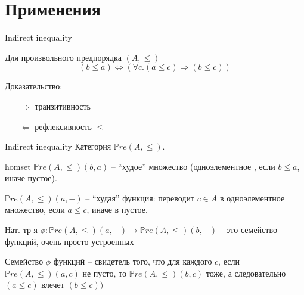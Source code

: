 \documentclass[
  russian,
  aspectratio=169,
  xcolor={svgnames},
  hyperref={colorlinks,citecolor=DeepPink4}]{beamer}
\begin{document}
\section{Применения}

\begin{frame}[fragile]{Indirect inequality}

Для произвольного предпорядка $(A,\leqslant)$
$$ (b \leqslant a) \Leftrightarrow(\forall c . (a \leqslant c) \Rightarrow(b \leqslant c)) $$

Доказательство:
\begin{enumerate}
 \item[$\Rightarrow$] транзитивность
 \item[$\Leftarrow$] рефлексивность $\leqslant$
\end{enumerate}

\end{frame}

\begin{frame}[fragile]{Indirect inequality}
Категория $\mathbb{P}re(A,\leqslant)$.
\vspace{0.5cm}

homset $\mathbb{P}re(A,\leqslant)(b,a)$ -- ``худое'' множество (одноэлементное , если $b\leqslant a$, иначе пустое).\vspace{0.5cm}

$\mathbb{P}re(A,\leqslant)(a,-)$ -- ``худая'' функция: переводит $c\in A$ в одноэлементное множество, если $a\leqslant c$, иначе в пустое.\vspace{0.5cm}

Нат. тр-я $\phi: \mathbb{P}re(A, \leqslant)(a,-) \rightarrow \mathbb{P}re(A, \leqslant)(b,-)$ -- это семейство функций, очень просто устроенных\vspace{0.5cm}

Семейство $\phi$ функций -- свидетель того, что для каждого $c$, если $\mathbb{P}re(A,\leqslant)(a,c)$ не пусто, то $\mathbb{P}re(A,\leqslant)(b,c)$ тоже, а следовательно  $(a \leqslant c)$  влечет $(b\leqslant c))$
\end{frame}
\end{document}
